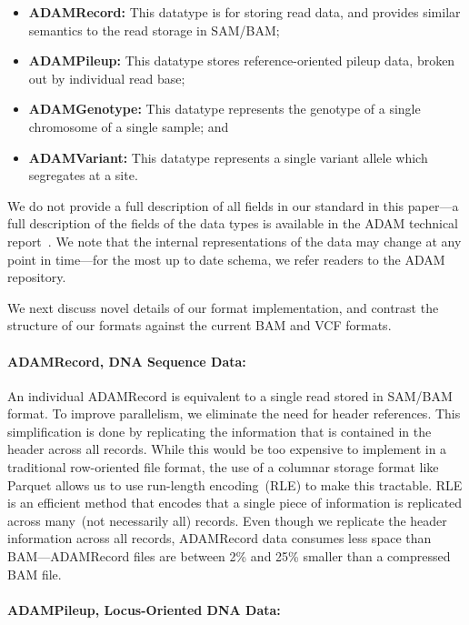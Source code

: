 \documentclass{bioinfo}
\begin{document}
\begin{itemize}
\item \textbf{ADAMRecord:} This datatype is for storing read data, and provides similar semantics to the read storage in SAM/BAM;
\item \textbf{ADAMPileup:} This datatype stores reference-oriented pileup data, broken out by individual read base;
\item \textbf{ADAMGenotype:} This datatype represents the genotype of a single chromosome of a single sample; and
\item \textbf{ADAMVariant:} This datatype represents a single variant allele which segregates at a site.
\end{itemize}

We do not provide a full description of all fields in our standard in this paper---a full description of the fields of the data types is available in the ADAM technical
report~\citep[see][\S5]{massie13}. We note that the internal representations of the data may change at any point in time---for the most up to date schema, we refer readers
to the ADAM repository.

We next discuss novel details of our format implementation, and contrast the structure of our formats against the current BAM and VCF formats. 

\paragraph{ADAMRecord, DNA Sequence Data:}
\label{sec:adamrecord}

An individual ADAMRecord is equivalent to a single read stored in SAM/BAM format. To improve parallelism, we eliminate the need for header references. This simplification
is done by replicating the information that is contained in the header across all records. While this would be too expensive to implement in a traditional row-oriented file format,
the use of a columnar storage format like Parquet allows us to use run-length encoding~(RLE) to make this tractable. RLE is an efficient method that encodes that a single piece
of information is replicated across many~(not necessarily all) records. Even though we replicate the header information across all records, ADAMRecord data consumes less
space than BAM---ADAMRecord files are between 2\% and 25\% smaller than a compressed BAM file.

\paragraph{ADAMPileup, Locus-Oriented DNA Data:}
\label{sec:adampileup}
\end{document}
